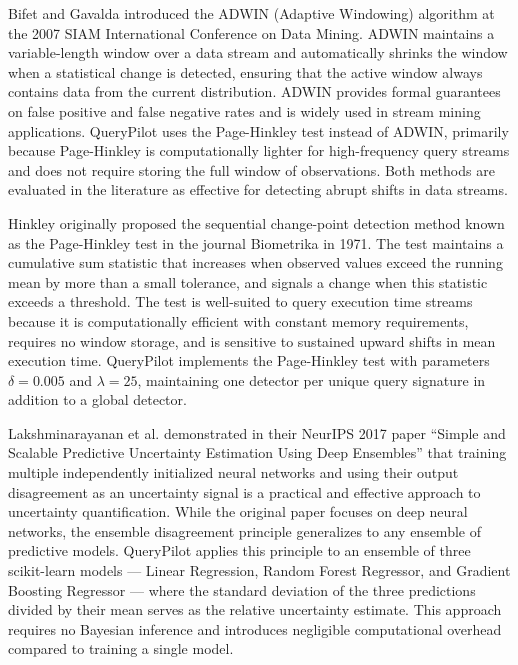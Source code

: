Bifet and Gavalda \cite{bifet2007adwin} introduced the ADWIN (Adaptive
Windowing) algorithm at the 2007 SIAM International Conference on Data Mining.
ADWIN maintains a variable-length window over a data stream and automatically
shrinks the window when a statistical change is detected, ensuring that the
active window always contains data from the current distribution. ADWIN
provides formal guarantees on false positive and false negative rates and is
widely used in stream mining applications. QueryPilot uses the Page-Hinkley
test instead of ADWIN, primarily because Page-Hinkley is computationally
lighter for high-frequency query streams and does not require storing the full
window of observations. Both methods are evaluated in the literature as
effective for detecting abrupt shifts in data streams.

Hinkley \cite{hinkley1971inference} originally proposed the sequential
change-point detection method known as the Page-Hinkley test in the journal
Biometrika in 1971. The test maintains a cumulative sum statistic that
increases when observed values exceed the running mean by more than a small
tolerance, and signals a change when this statistic exceeds a threshold. The
test is well-suited to query execution time streams because it is
computationally efficient with constant memory requirements, requires no window
storage, and is sensitive to sustained upward shifts in mean execution time.
QueryPilot implements the Page-Hinkley test with parameters $\delta = 0.005$
and $\lambda = 25$, maintaining one detector per unique query signature in
addition to a global detector.

Lakshminarayanan et al. \cite{lakshminarayanan2017ensembles} demonstrated in
their NeurIPS 2017 paper ``Simple and Scalable Predictive Uncertainty
Estimation Using Deep Ensembles'' that training multiple independently
initialized neural networks and using their output disagreement as an
uncertainty signal is a practical and effective approach to uncertainty
quantification. While the original paper focuses on deep neural networks,
the ensemble disagreement principle generalizes to any ensemble of predictive
models. QueryPilot applies this principle to an ensemble of three scikit-learn
models --- Linear Regression, Random Forest Regressor, and Gradient Boosting
Regressor --- where the standard deviation of the three predictions divided by
their mean serves as the relative uncertainty estimate. This approach requires
no Bayesian inference and introduces negligible computational overhead compared
to training a single model.
